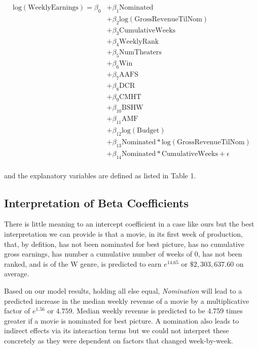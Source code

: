 \documentclass[10.7pt]{article} %
\begin{document}
\begin{align*}
\mathrm{log(WeeklyEarnings)} = \beta_{0}
    &+ \beta_{1}  \mathrm{Nominated} \\
    &+ \beta_{2}  \mathrm{log(GrossRevenueTilNom)} \\
    &+ \beta_{3}  \mathrm{CumulativeWeeks} \\
    &+ \beta_{4}  \mathrm{WeeklyRank} \\
    &+ \beta_{5}  \mathrm{NumTheaters} \\
    &+ \beta_{6}  \mathrm{Win}  \\
    &+ \beta_{7}  \mathrm{AAFS} \\
    &+ \beta_{8}  \mathrm{DCR} \\
    &+ \beta_{9}  \mathrm{CMHT} \\
    &+ \beta_{10}  \mathrm{BSHW} \\
    &+ \beta_{11}  \mathrm{AMF} \\
    &+ \beta_{12}  \mathrm{log(Budget)} \\
    &+ \beta_{13}  \mathrm{Nominated*log(GrossRevenueTilNom)} \\
    &+ \beta_{14}  \mathrm{Nominated*CumulativeWeeks} + \epsilon\\
\end{align*}
\setlength\parindent{0pt}

and the explanatory variables are defined as listed in Table 1. 

\setlength{\parindent}{20pt}

\subsection{Interpretation of Beta Coefficients}

There is little meaning to an intercept coefficient in a case like ours but the best interpretation we can provide is that a movie, in its first week of production, that, by defition, has not been nominated for best picture, has no cumulative gross earnings, has number a cumulative number of weeks of 0, has not been ranked, and is of the W genre, is predicted to earn $e^{14.65}$ or $\$2,303,637.60$ on average.

Based on our model results, holding all else equal, \textit{Nomination} will lead to a predicted increase in the median weekly revenue of a movie by a multiplicative factor of $e^{1.56}$ or $4.759$. Median weekly revenue is predicted to be 4.759 times greater if a movie is nominated for best picture. A nomination also leads to indirect effects via its interaction terms but we could not interpret these concretely as they were dependent on factors that changed week-by-week.
\end{document}
